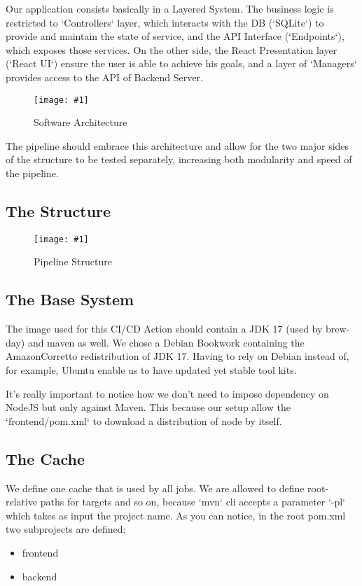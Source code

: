 \documentclass[a4paper,10pt]{scrartcl}
\newcommand{\putimage}[3] {
	\begin{figure}[H]
	    \centering
	    \texttt{[image: \#1]}
	    \caption{#2}\label{#3}
	\end{figure}
}
\begin{document}
Our application consists basically in a Layered System. The business logic is restricted to `Controllers` layer, which interacts with the DB (`SQLite`) to provide and maintain the state of service, and the API Interface (`Endpoints`), which exposes those services. On the other side, the React Presentation layer (`React UI`) ensure the user is able to achieve his goals, and a layer of `Managers` provides access to the API of Backend Server.

\putimage{Arch.png}{Software Architecture}{fig:arch}

The pipeline should embrace this architecture and allow for the two major sides of the structure to be tested separately, increasing both modularity and speed of the pipeline.

\subsection{The Structure}

\putimage{Pipeline.png}{Pipeline Structure}{fig:pipeline}

\subsection{The Base System}

The image used for this CI/CD Action should contain a JDK 17 (used by brew-day) and maven as well. We chose a Debian Bookwork containing the AmazonCorretto redistribution of JDK 17. Having to rely on Debian instead of, for example, Ubuntu enable us to have updated yet stable tool kits.

It's really important to notice how we don't need to impose dependency on NodeJS but only against Maven. This because our setup allow the `frontend/pom.xml` to download a distribution of node by itself.

\subsection{The Cache}

We define one cache that is used by all jobs. We are allowed to define root-relative paths for targets and so on, because `mvn` cli accepts a parameter `-pl` which takes as input the project name. As you can notice, in the root pom.xml two subprojects are defined:

\begin{itemize}
    \item frontend
    \item backend
\end{itemize}
\end{document}
